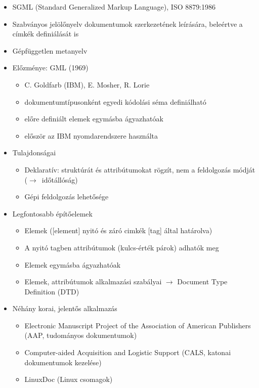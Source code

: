 \documentclass[usenames,dvipsnames,aspectratio=169]{beamer}
\newcommand{\kiemel}[1]{{\color{kiemelesszin}#1}}
\begin{document}
\begin{frame}
  \begin{itemize}
    \item SGML (Standard Generalized Markup Language), ISO 8879:1986
    \item Szabványos jelölőnyelv dokumentumok szerkezetének leírására,
beleértve a címkék definiálását is
    \item Gépfüggetlen metanyelv
    \item Előzménye: GML (1969)
    \begin{itemize}
      \item C. \kiemel{G}oldfarb (IBM), E. \kiemel{M}osher, R. \kiemel{L}orie
      \item dokumentumtípusonként egyedi kódolási séma definiálható
      \item előre definiált elemek egymásba ágyazhatóak
      \item először az IBM nyomdarendszere használta
    \end{itemize}
    \item Tulajdonságai
    \begin{itemize}
      \item Deklaratív: struktúrát és attribútumokat rögzít, nem a feldolgozás módját ($\to$~időtállóság)
      \item Gépi feldolgozás lehetősége
    \end{itemize}
  \end{itemize}
\end{frame}

\begin{frame}
  \begin{itemize}
    \item Legfontosabb építőelemek
    \begin{itemize}
      \item Elemek ([element] nyitó és záró cimkék [tag] által határolva)
      \item A nyitó tagben attribútumok (kulcs-érték párok) adhatók meg
      \item Elemek egymásba ágyazhatóak
      \item Elemek, attribútumok alkalmazási szabályai $\to$ Document Type Definition (DTD)
    \end{itemize}
    \item Néhány korai, jelentős alkalmazás
    \begin{itemize}
      \item Electronic Manuscript Project of the Association of American Publishers (AAP, tudományos dokumentumok)
      \item Computer-aided Acquisition and Logistic Support (CALS, katonai dokumentumok kezelése)
      \item LinuxDoc (Linux csomagok)
    \end{itemize}
  \end{itemize}
\end{frame}
\end{document}
